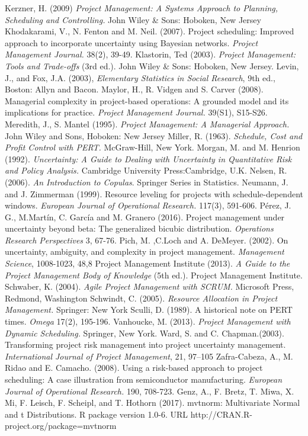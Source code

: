 \documentclass[11pt]{article}
\begin{document}
\begin{thebibliography}{10}
  	Kerzner, H.  (2009)  {\em Project Management: A Systems Approach to Planning, Scheduling and Controlling.} John Wiley \& Sons: Hoboken, New Jersey
  	Khodakarami, V., N. Fenton and M. Neil. (2007). Project scheduling: Improved approach to incorporate uncertainty using Bayesian networks. {\em Project Management Journal.} 38(2),  39-49.
  	Klastorin, Ted (2003). {\em Project Management: Tools and Trade-offs} (3rd ed.). John Wiley \& Sons: Hoboken, New Jersey.
  Levin, J., and Fox, J.A. (2003), {\em Elementary Statistics in Social Research}, 9th ed., Boston: Allyn and Bacon.
  	Maylor, H., R. Vidgen and S. Carver (2008). Managerial complexity in project-based operations: A grounded model and its implications for practice.  {\em Project Management Journal.} 39(S1), S15-S26.
  	Meredith, J., S. Mantel (1995). {\em Project Management: A Managerial Approach.} John Wiley and Sons, Hoboken: New Jersey
  	Miller, R. (1963). {\em Schedule, Cost and Profit Control with PERT.} McGraw-Hill, New
              York.
   Morgan, M. and M. Henrion (1992). {\em Uncertainty: A Guide to Dealing with Uncertainty in
  Quantitative Risk and Policy Analysis.}  Cambridge University Press:Cambridge, U.K.
   Nelsen, R. (2006). {\em An Introduction to Copulas}. Springer Series in Statistics.
    Neumann, J. and J. Zimmerman (1999).  Resource leveling for projects with schedule-dependent windows.  {\em European Journal of Operational Research.}  117(3), 591-606.
   Pérez, J. G., M.Martín, C. García and M. Granero (2016). Project management under uncertainty beyond beta: The generalized bicubic distribution. {\em Operations Research Perspectives} 3, 67-76.
   Pich, M. ,C.Loch and A. DeMeyer. (2002). On uncertainty, ambiguity, and
  complexity in project management. {\em Management Science}, 1008-1023, 48,8
   Project Management Institute (2013). {\em A Guide to the Project Management Body of
  Knowledge} (5th ed.). Project Management Institute.
   Schwaber, K.  (2004). {\em Agile Project Management with SCRUM.} Microsoft Press,
           Redmond, Washington
   Schwindt, C. (2005). {\em Resource Allocation in Project Management.} Springer: New York
   Sculli, D. (1989). A historical note on PERT times. {\em Omega} 17(2), 195-196.
   Vanhoucke, M. (2013). {\em Project Management with Dynamic Scheduling.} Springer, New
          York.
   Ward, S. and C. Chapman.(2003). Transforming project risk management into project
          uncertainty management. {\em International Journal of Project Management}, 21, 97–105
   Zafra-Cabeza, A., M. Ridao and E. Camacho. (2008). Using a risk-based approach to
         project scheduling: A case illustration from semiconductor manufacturing. {\em European
        Journal of Operational Research.} 190, 708-723.
   Genz, A., F. Bretz, T. Miwa, X. Mi, F. Leisch, F. Scheipl, and T. Hothorn (2017).
  mvtnorm: Multivariate Normal and t Distributions. R package version 1.0-6. URL
  http://CRAN.R-project.org/package=mvtnorm
  \end{thebibliography}
\end{document}
